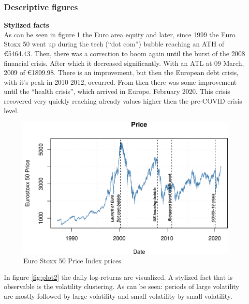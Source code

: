\documentclass[a4paper, twoside]{templates/ociamthesis}
\begin{document}
\hypertarget{descriptive-figures}{%
\subsubsection{Descriptive figures}\label{descriptive-figures}}

\textbf{Stylized facts}~\\
\noindent As can be seen in figure \ref{fig:plot1} the Euro area equity and later, since 1999 the Euro Stoxx 50 went up during the tech (``dot com'') bubble reaching an ATH of €5464.43. Then, there was a correction to boom again until the burst of the 2008 financial crisis. After which it decreased significantly. With an ATL at 09 March, 2009 of €1809.98. There is an improvement, but then the European debt crisis, with it's peak in 2010-2012, occurred. From then there was some improvement until the ``health crisis'', which arrived in Europe, February 2020. This crisis recovered very quickly reaching already values higher then the pre-COVID crisis level.

\begin{figure}[h]

{\centering \includegraphics[width=1\linewidth]{_main_files/figure-latex/plot1-1} 

}

\caption{Euro Stoxx 50 Price Index prices}\label{fig:plot1}
\end{figure}

\newpage

\noindent In figure \ref{fig:plot2} the daily log-returns are visualized. A stylized fact that is observable is the volatility clustering. As can be seen: periods of large volatility are mostly followed by large volatility and small volatility by small volatility.
\end{document}
